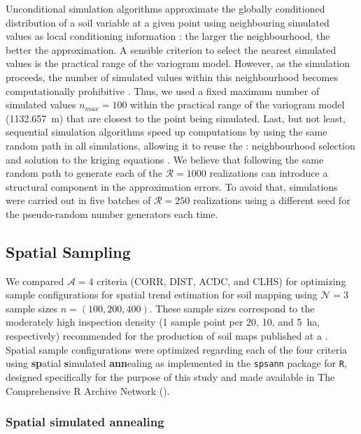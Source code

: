 Unconditional simulation algorithms approximate the globally conditioned distribution of a soil variable at a 
given point using neighbouring simulated values as local conditioning information \cite{Goovaerts1997}: the 
larger the neighbourhood, the better the approximation. A sensible criterion to select the nearest simulated 
values is the practical range of the variogram model. However, as the simulation proceeds, the number of 
simulated values within this neighbourhood becomes computationally prohibitive \cite{Goovaerts1997, 
WebsterEtAl2007, Pebesma2013}. Thus, we used a fixed maximum number of simulated values $n_{max} = 100$ within 
the practical range of the variogram model (\SI{1132.657}{\m}) that are closest to the point being simulated. 
Last, but not least, sequential simulation algorithms speed up computations by using the same random path in 
all simulations, allowing it to reuse the : neighbourhood selection and solution to the 
kriging equations \cite{Goovaerts1997, WebsterEtAl2007, Pebesma2013}. We believe that following the same random 
path to generate each of the $\mathcal{R} = 1000$ realizations can introduce a structural component in the 
approximation errors. To avoid that, simulations were carried out in five batches of $\mathcal{R} = 250$ 
realizations using a different seed for the pseudo-random number generators each time.

\subsection{Spatial Sampling}

We compared $\mathcal{A} = 4$ criteria (CORR, DIST, ACDC, and CLHS) for optimizing sample configurations for 
spatial trend estimation for soil mapping using $\mathcal{N} = 3$ sample sizes $n = (100, 200, 400)$. These 
sample sizes correspond to the moderately high inspection density (1 sample point per 20, 10, and 
\SI{5}{\hectare}, respectively) recommended for the production of soil maps published at a  
\cite{Rossiter2000}. Spatial sample configurations were optimized regarding each of the four criteria using 
\textbf{sp}atial \textbf{s}imulated \textbf{ann}ealing as implemented in the \texttt{spsann} package for 
\texttt{R}, designed specifically for the purpose of this study and made available in The Comprehensive R 
Archive Network (\cran).

\subsubsection{Spatial simulated annealing}
\label{sec:chap08-spsann}

